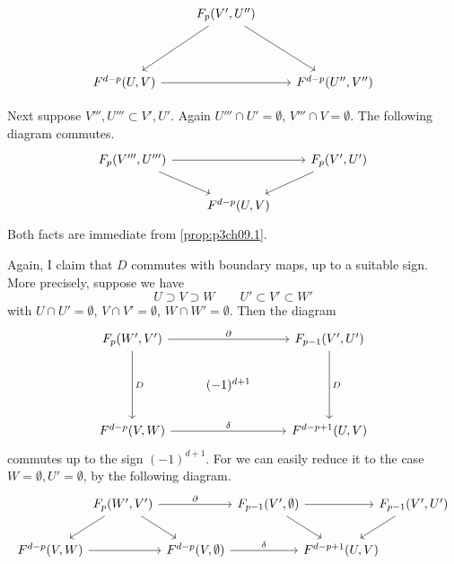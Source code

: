 \documentclass[../main]{subfiles}
\begin{document}
\[
\begin{tikzcd}
                          & {F_p(V',U'')} \arrow[ldd] \arrow[rdd] &                    \\
                          &                                       &                    \\
{F^{d-p}(U,V)} \arrow[rr] &                                       & {F^{d-p}(U'',V'')}
\end{tikzcd}
\]


Next suppose $V''',U''' \subset V',U'$. Again $U''' \cap U' = \emptyset$, $V''' \cap V = \emptyset$. The following diagram commutes.
\[
\begin{tikzcd}
{F_p(V''', U''')} \arrow[rd] \arrow[rr] &                   & {F_p(V', U')} \arrow[ld] \\
                                        & {F^{d - p}(U, V)} &                         
\end{tikzcd}
\]
Both facts are immediate from \ref{prop:p3ch09.1}.

Again, I claim that $D$ commutes with boundary maps, up to a suitable sign. More precisely, suppose we have
\[U \supset V \supset W \qquad U' \subset V' \subset W'\]
with $U \cap U' = \emptyset$, $V \cap V' = \emptyset$, $W \cap W' = \emptyset$. Then the diagram
\[
\begin{tikzcd}
{F_p(W', V')} \arrow[rr, "\partial"] \arrow[dd, "D"] &              & {F_{p - 1}(V', U')} \arrow[dd, "D"] \\
                                                     & (-1)^{d + 1} &                                     \\
{F^{d - p}(V, W)} \arrow[rr, "\delta"]               &              & {F^{d - p + 1}(U, V)}              
\end{tikzcd}
\]
commutes up to the sign $(-1)^{d+1}$. For we can easily reduce it to the case $W = \emptyset, U' = \emptyset$, by the following diagram.
\[
\begin{tikzcd}[column sep = {5.8em, between origins}]
                             & {F_p(W', V')} \arrow[ld] \arrow[rd]\arrow[rr, "\partial"] &                                                & {F_{p - 1}(V', \emptyset)} \arrow[rd] \arrow[rr] &                       & {F_{p - 1}(V', U')} \arrow[ld] \\
{F^{d - p}(V, W)} \arrow[rr] &                                                 & {F^{d - p}(V, \emptyset)} \arrow[rr, "\delta"] &                                                  & {F^{d - p + 1}(U, V)} &                               
\end{tikzcd}
\]
\end{document}
